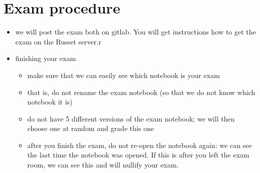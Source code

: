 \documentclass[]{book}
\providecommand{\tightlist}{%
  \setlength{\itemsep}{0pt}\setlength{\parskip}{0pt}}
\begin{document}
\section{Exam procedure}\label{exam-procedure}

\begin{itemize}
\tightlist
\item
  we will post the exam both on gitlab. You will get instructions how to
  get the exam on the Russet server.r
\item
  finishing your exam

  \begin{itemize}
  \tightlist
  \item
    make sure that we can easily see which notebook is your exam
  \item
    that is, do not rename the exam notebook (so that we do not know
    which notebook it is)
  \item
    do not have 5 different versions of the exam notebook; we will then
    choose one at random and grade this one
  \item
    after you finish the exam, do not re-open the notebook again: we can
    see the last time the notebook was opened. If this is after you left
    the exam room, we can see this and will nullify your exam.
  \end{itemize}
\end{itemize}


\end{document}
